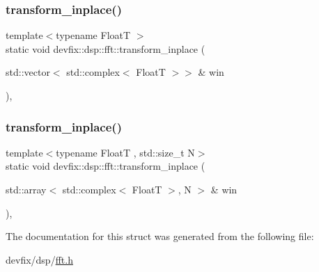 \subsubsection{\texorpdfstring{transform\+\_\+inplace()}{transform\_inplace()}\hspace{0.1cm}{\footnotesize\ttfamily [2/3]}}
{\footnotesize\ttfamily template$<$typename FloatT $>$ \\
static void devfix\+::dsp\+::fft\+::transform\+\_\+inplace (\begin{DoxyParamCaption}\item[{std\+::vector$<$ std\+::complex$<$ FloatT $>$$>$ \&}]{win }\end{DoxyParamCaption})\hspace{0.3cm}{\ttfamily [inline]}, {\ttfamily [static]}}

\mbox{\label{structdevfix_1_1dsp_1_1fft_a56cf2ee0f12d0a4c4bdcded3db38e088}} 
\subsubsection{\texorpdfstring{transform\+\_\+inplace()}{transform\_inplace()}\hspace{0.1cm}{\footnotesize\ttfamily [3/3]}}
{\footnotesize\ttfamily template$<$typename FloatT , std\+::size\+\_\+t N$>$ \\
static void devfix\+::dsp\+::fft\+::transform\+\_\+inplace (\begin{DoxyParamCaption}\item[{std\+::array$<$ std\+::complex$<$ FloatT $>$, N $>$ \&}]{win }\end{DoxyParamCaption})\hspace{0.3cm}{\ttfamily [inline]}, {\ttfamily [static]}}



The documentation for this struct was generated from the following file\+:\begin{DoxyCompactItemize}
\item 
devfix/dsp/\hyperlink{fft_8h}{fft.\+h}\end{DoxyCompactItemize}
